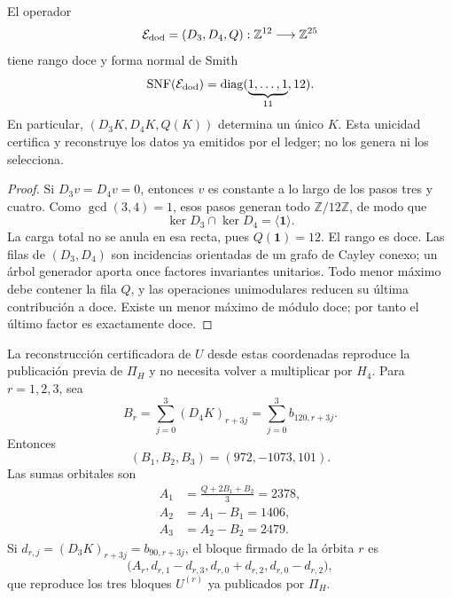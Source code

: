 \begin{theorem}
\label{p3-83-c25-s4:thm:completitud-extractor-transversal-k}
El operador
\[
 \mathcal E_{\rm dod}=(D_3,D_4,Q):
 \mathbb Z^{12}\longrightarrow\mathbb Z^{25}
\]
tiene rango doce y forma normal de Smith
\begin{equation}
 \operatorname{SNF}(\mathcal E_{\rm dod})
 =\operatorname{diag}(\underbrace{1,\ldots,1}_{11},12).
 \label{p3-83-c25-s4:eq:snf-extractor-transversal-k}
\end{equation}
En particular, \((D_3K,D_4K,Q(K))\) determina un único \(K\). Esta
unicidad certifica y reconstruye los datos ya emitidos por el ledger; no los
genera ni los selecciona.
\end{theorem}

\begin{proof}
Si \(D_3v=D_4v=0\), entonces \(v\) es constante a lo largo de los pasos
tres y cuatro. Como \(\gcd(3,4)=1\), esos pasos generan todo
\(\mathbb Z/12\mathbb Z\), de modo que
\[
 \ker D_3\cap\ker D_4=\langle\mathbf1\rangle.
\]
La carga total no se anula en esa recta, pues \(Q(\mathbf1)=12\). El rango
es doce. Las filas de \((D_3,D_4)\) son incidencias orientadas de un grafo
de Cayley conexo; un árbol generador aporta once factores invariantes
unitarios. Todo menor máximo debe contener la fila \(Q\), y las operaciones
unimodulares reducen su última contribución a doce. Existe un menor máximo de
módulo doce; por tanto el último factor es exactamente doce.
\end{proof}

La reconstrucción certificadora de \(U\) desde estas coordenadas reproduce la
publicación previa de \(\Pi_H\) y no necesita volver a multiplicar por
\(H_4\). Para \(r=1,2,3\), sea
\begin{equation}
 B_r=\sum_{j=0}^{3}(D_4K)_{r+3j}
 =\sum_{j=0}^{3}b_{120,r+3j}.
 \label{p3-83-c25-s4:eq:br-diferencias-k}
\end{equation}
Entonces
\[
 (B_1,B_2,B_3)=(972,-1073,101).
\]
Las sumas orbitales son
\begin{align}
 A_1&=\frac{Q+2B_1+B_2}{3}=2378,
 \label{p3-83-c25-s4:eq:a1-reconstruccion-u}\\
 A_2&=A_1-B_1=1406,
 \label{p3-83-c25-s4:eq:a2-reconstruccion-u}\\
 A_3&=A_2-B_2=2479.
 \label{p3-83-c25-s4:eq:a3-reconstruccion-u}
\end{align}
Si \(d_{r,j}=(D_3K)_{r+3j}=b_{90,r+3j}\), el bloque firmado de la órbita
\(r\) es
\begin{equation}
 \bigl(A_r,
 d_{r,1}-d_{r,3},
 d_{r,0}+d_{r,2},
 d_{r,0}-d_{r,2}\bigr),
 \label{p3-83-c25-s4:eq:bloque-firmado-desde-diferencias}
\end{equation}
que reproduce los tres bloques \(U^{(r)}\) ya publicados por \(\Pi_H\).

